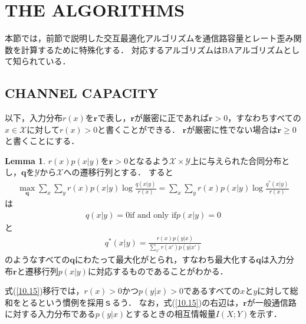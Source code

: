 \documentclass{ltjsarticle}
\theoremstyle{definition}
\newtheorem{lem}[dfn]{Lemma}
\begin{document}
\section{THE ALGORITHMS}
本節では，前節で説明した交互最適化アルゴリズムを通信路容量とレート歪み関数を計算するために特殊化する．
対応するアルゴリズムはBAアルゴリズムとして知られている．

\subsection{CHANNEL CAPACITY}
以下，入力分布$r(x)$を$\mathbf{r}$で表し，$\mathbf{r}$が厳密に正であれば$\mathbf{r} > 0$，すなわちすべての$x \in \mathcal{X}$に対して$r(x) > 0$と書くことができる．
$\mathbf{r}$が厳密に性でない場合は$\mathbf{r} \geq 0$と書くことにする．

\begin{lem}
  \label{Lemma10.1}
  $r(x)p(x|y)$を$\mathbf{r} > 0$となるよう$\mathcal{X} \times \mathcal{Y}$上に与えられた合同分布とし，$\mathbf{q}$を$\mathcal{Y}$から$\mathcal{X}$への遷移行列とする．
  すると
  \begin{eqnarray}
    \label{10.15}
    \max_{\mathbf{q}} \sum_{x} \sum_{y} r(x) p(x|y) \log \frac{q(x|y)}{r(x)} = \sum_{x} \sum_{y} r(x) p(x|y) \log \frac{q^*(x|y)}{r(x)}
  \end{eqnarray}
  は
  \begin{eqnarray}
    \label{10.16}
    q(x|y) = 0 \mbox{if and only if} p(x|y) = 0
  \end{eqnarray}
  と
  \begin{eqnarray}
    \label{10.17}
    q^*(x|y) = \frac{r(x)p(y|x)}{\sum_{x'} r(x')p(y|x')}
  \end{eqnarray}
  のようなすべての$\mathbf{q}$にわたって最大化がとられ，すなわち最大化する$\mathbf{q}$は入力分布$\mathbf{r}$と遷移行列$p(x|y)$に対応するものであることがわかる．
\end{lem}

式(\ref{10.15})移行では，$r(x) > 0$かつ$p(y|x) > 0$であるすべての$x$と$y$に対して総和をとるという慣例を採用ｓるう．
なお，式(\ref{10.15})の右辺は，$\mathbf{r}$が一般通信路に対する入力分布である$p(y|x)$とするときの相互情報量$I(X;Y)$を示す．
\end{document}
